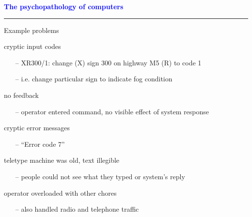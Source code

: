 \documentclass[pdf]{beamer}
\begin{document}
\begin{frame}
    \textcolor{Blue}{\textbf{\Large{The psychopathology of computers}}}
    \textcolor{red}{\rule{10cm}{1mm}}
    
{\LARGE{{Example problems}}}

{\normalsize cryptic input codes }
\begin{itemize}
  \item[\textcolor{black}{--}] {\footnotesize XR300/1: change (X)  sign 300 on highway M5 (R) to code 1 }
  \item[\textcolor{black}{--}] {\footnotesize i.e. change particular sign to indicate fog condition}
\end{itemize}
\bigskip

{\normalsize no feedback}
\begin{itemize}
  \item[\textcolor{black}{--}] {\footnotesize operator entered command, no visible effect of system response}
\end{itemize}
\bigskip

{\normalsize cryptic error messages}
\begin{itemize}
  \item[\textcolor{black}{--}] {\footnotesize “Error code 7”}
\end{itemize}
\bigskip

{\normalsize teletype machine was old, text illegible}
\begin{itemize}
  \item[\textcolor{black}{--}] {\footnotesize people could not see what they typed or system’s reply}
\end{itemize}
\bigskip

{\normalsize operator overloaded with other chores}
\begin{itemize}
  \item[\textcolor{black}{--}] {\footnotesize also handled radio and telephone traffic}
\end{itemize}
\end{frame}
\end{document}
